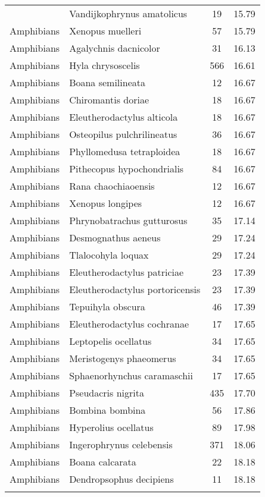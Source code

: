 \begin{longtable}{llcc}
{  Amphibians & Vandijkophrynus amatolicus &  19 & 15.79 \\ 
  Amphibians & Xenopus muelleri &  57 & 15.79 \\ 
  Amphibians & Agalychnis dacnicolor &  31 & 16.13 \\ 
  Amphibians & Hyla chrysoscelis & 566 & 16.61 \\ 
  Amphibians & Boana semilineata &  12 & 16.67 \\ 
  Amphibians & Chiromantis doriae &  18 & 16.67 \\ 
  Amphibians & Eleutherodactylus alticola &  18 & 16.67 \\ 
  Amphibians & Osteopilus pulchrilineatus &  36 & 16.67 \\ 
  Amphibians & Phyllomedusa tetraploidea &  18 & 16.67 \\ 
  Amphibians & Pithecopus hypochondrialis &  84 & 16.67 \\ 
  Amphibians & Rana chaochiaoensis &  12 & 16.67 \\ 
  Amphibians & Xenopus longipes &  12 & 16.67 \\ 
  Amphibians & Phrynobatrachus gutturosus &  35 & 17.14 \\ 
  Amphibians & Desmognathus aeneus &  29 & 17.24 \\ 
  Amphibians & Tlalocohyla loquax &  29 & 17.24 \\ 
  Amphibians & Eleutherodactylus patriciae &  23 & 17.39 \\ 
  Amphibians & Eleutherodactylus portoricensis &  23 & 17.39 \\ 
  Amphibians & Tepuihyla obscura &  46 & 17.39 \\ 
  Amphibians & Eleutherodactylus cochranae &  17 & 17.65 \\ 
  Amphibians & Leptopelis ocellatus &  34 & 17.65 \\ 
  Amphibians & Meristogenys phaeomerus &  34 & 17.65 \\ 
  Amphibians & Sphaenorhynchus caramaschii &  17 & 17.65 \\ 
  Amphibians & Pseudacris nigrita & 435 & 17.70 \\ 
  Amphibians & Bombina bombina &  56 & 17.86 \\ 
  Amphibians & Hyperolius ocellatus &  89 & 17.98 \\ 
  Amphibians & Ingerophrynus celebensis & 371 & 18.06 \\ 
  Amphibians & Boana calcarata &  22 & 18.18 \\ 
  Amphibians & Dendropsophus decipiens &  11 & 18.18 \\ 
}
\end{longtable}
